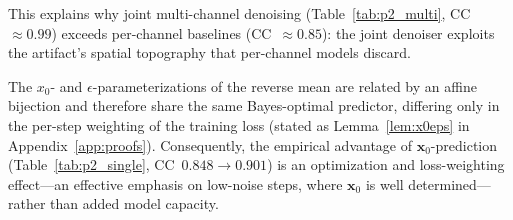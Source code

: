 This explains why joint multi-channel denoising (Table~\ref{tab:p2_multi}, CC~$\approx 0.99$) exceeds per-channel baselines (CC~$\approx 0.85$): the joint denoiser exploits the artifact's spatial topography that per-channel models
discard.

The $x_0$- and $\epsilon$-parameterizations of the reverse mean are related by an
affine bijection and therefore share the same Bayes-optimal predictor, differing
only in the per-step weighting of the training loss (stated as
Lemma~\ref{lem:x0eps} in Appendix~\ref{app:proofs}). Consequently, the empirical
advantage of $\mathbf{x}_0$-prediction (Table~\ref{tab:p2_single},
CC~$0.848\!\to\!0.901$) is an optimization and loss-weighting effect---an
effective emphasis on low-noise steps, where $\mathbf{x}_0$ is well
determined---rather than added model capacity.
